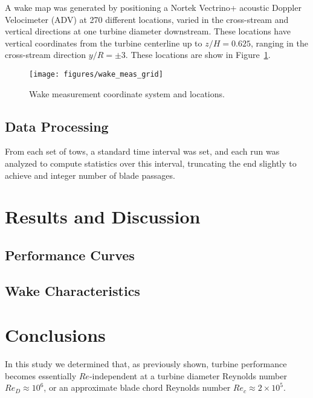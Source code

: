 \documentclass[energies,article,accept,moreauthors,pdftex,12pt,a4paper]{mdpi}
\begin{document}
A wake map was generated by positioning a Nortek Vectrino+ acoustic Doppler
Velocimeter (ADV) at 270 different locations, varied in the cross-stream and
vertical directions at one turbine diameter downstream. These locations have
vertical coordinates from the turbine centerline up to $z/H=0.625$, ranging in
the cross-stream direction $y/R = \pm 3$. These locations are show in
Figure~\ref{fig:wake_locations}.

\begin{figure}
\centering
\texttt{[image: figures/wake\_meas\_grid]}
\caption{Wake measurement coordinate system and locations.}
\label{fig:wake_locations}
\end{figure}

\subsection{Data Processing}

From each set of tows, a standard time interval was set, and each run was
analyzed to compute statistics over this interval, truncating the end slightly
to achieve and integer number of blade passages.



\section{Results and Discussion}


\subsection{Performance Curves}



\subsection{Wake Characteristics}



\section{Conclusions}

In this study we determined that, as previously shown, turbine performance
becomes essentially $Re$-independent at a turbine diameter Reynolds number $Re_D
\approx 10^6$, or an approximate blade chord Reynolds number $Re_c \approx 2
\times 10^5$.
\end{document}
